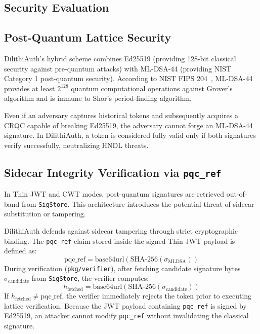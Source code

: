 \documentclass{article}
\begin{document}
\begin{IEEEkeywords}
\section{Security Evaluation}

\subsection{Post-Quantum Lattice Security}
DilithiAuth's hybrid scheme combines Ed25519 (providing 128-bit classical security against pre-quantum attacks) with ML-DSA-44 (providing NIST Category 1 post-quantum security). According to NIST FIPS 204~\cite{fips204}, ML-DSA-44 provides at least $2^{128}$ quantum computational operations against Grover's algorithm and is immune to Shor's period-finding algorithm.

Even if an adversary captures historical tokens and subsequently acquires a CRQC capable of breaking Ed25519, the adversary cannot forge an ML-DSA-44 signature. In DilithiAuth, a token is considered fully valid only if both signatures verify successfully, neutralizing HNDL threats.

\subsection{Sidecar Integrity Verification via \texttt{pqc\_ref}}
In Thin JWT and CWT modes, post-quantum signatures are retrieved out-of-band from \texttt{SigStore}. This architecture introduces the potential threat of sidecar substitution or tampering.

DilithiAuth defends against sidecar tampering through strict cryptographic binding. The \texttt{pqc\_ref} claim stored inside the signed Thin JWT payload is defined as:
\begin{equation}
\text{pqc\_ref} = \text{base64url}(\text{SHA-256}(\sigma_{\text{MLDSA}}))
\end{equation}
During verification (\texttt{pkg/verifier}), after fetching candidate signature bytes $\sigma_{\text{candidate}}$ from \texttt{SigStore}, the verifier computes:
\begin{equation}
h_{\text{fetched}} = \text{base64url}(\text{SHA-256}(\sigma_{\text{candidate}}))
\end{equation}
If $h_{\text{fetched}} \neq \text{pqc\_ref}$, the verifier immediately rejects the token prior to executing lattice verification. Because the JWT payload containing \texttt{pqc\_ref} is signed by Ed25519, an attacker cannot modify \texttt{pqc\_ref} without invalidating the classical signature.


\end{IEEEkeywords}
\end{document}
